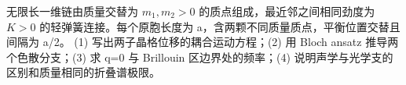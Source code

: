 无限长一维链由质量交替为 \(m_1,m_2>0\) 的质点组成，最近邻之间相同劲度为 \(K>0\) 的轻弹簧连接。每个原胞长度为 a，含两颗不同质量质点，平衡位置交替且间隔为 a/2。
(1) 写出两子晶格位移的耦合运动方程；(2) 用 Bloch ansatz 推导两个色散分支；(3) 求 q=0 与 Brillouin 区边界处的频率；(4) 说明声学与光学支的区别和质量相同的折叠谱极限。
